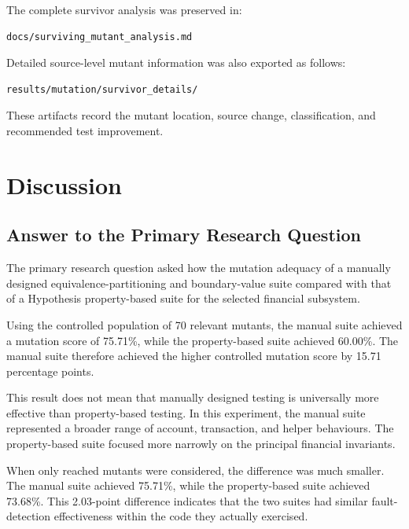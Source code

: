 \documentclass[12pt]{article}
\begin{document}
The complete survivor analysis was preserved in:

\begin{verbatim}
docs/surviving_mutant_analysis.md
\end{verbatim}

Detailed source-level mutant information was also exported as follows:

\begin{verbatim}
results/mutation/survivor_details/
\end{verbatim}

These artifacts record the mutant location, source change, classification, and
recommended test improvement.


\section{Discussion}

\subsection{Answer to the Primary Research Question}

The primary research question asked how the mutation adequacy of a manually
designed equivalence-partitioning and boundary-value suite compared with that
of a Hypothesis property-based suite for the selected financial subsystem.

Using the controlled population of 70 relevant mutants, the manual suite
achieved a mutation score of 75.71\%, while the property-based suite achieved
60.00\%. The manual suite therefore achieved the higher controlled mutation
score by 15.71 percentage points.

This result does not mean that manually designed testing is universally more
effective than property-based testing. In this experiment, the manual suite
represented a broader range of account, transaction, and helper behaviours.
The property-based suite focused more narrowly on the principal financial
invariants.

When only reached mutants were considered, the difference was much smaller.
The manual suite achieved 75.71\%, while the property-based suite achieved
73.68\%. This 2.03-point difference indicates that the two suites had similar
fault-detection effectiveness within the code they actually exercised.
\end{document}
